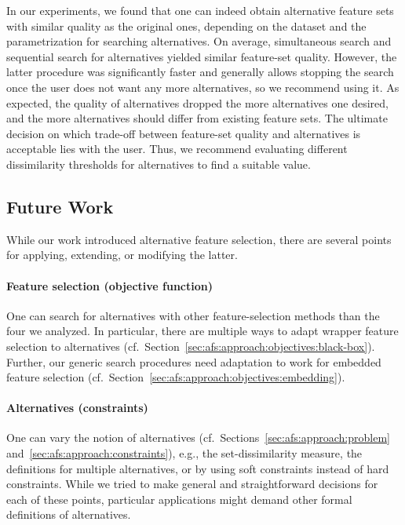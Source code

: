 \documentclass{article}
\theoremstyle{definition}
\begin{document}
In our experiments, we found that one can indeed obtain alternative feature sets with similar quality as the original ones, depending on the dataset and the parametrization for searching alternatives.
On average, simultaneous search and sequential search for alternatives yielded similar feature-set quality.
However, the latter procedure was significantly faster and generally allows stopping the search once the user does not want any more alternatives, so we recommend using it.
As expected, the quality of alternatives dropped the more alternatives one desired, and the more alternatives should differ from existing feature sets.
The ultimate decision on which trade-off between feature-set quality and alternatives is acceptable lies with the user.
Thus, we recommend evaluating different dissimilarity thresholds for alternatives to find a suitable value.

\subsection{Future Work}

While our work introduced alternative feature selection, there are several points for applying, extending, or modifying the latter.

\paragraph{Feature selection (objective function)}

One can search for alternatives with other feature-selection methods than the four we analyzed.
In particular, there are multiple ways to adapt wrapper feature selection to alternatives (cf.~Section~\ref{sec:afs:approach:objectives:black-box}).
Further, our generic search procedures need adaptation to work for embedded feature selection (cf.~Section~\ref{sec:afs:approach:objectives:embedding}).

\paragraph{Alternatives (constraints)}

One can vary the notion of alternatives (cf.~Sections~\ref{sec:afs:approach:problem} and~\ref{sec:afs:approach:constraints}), e.g., the set-dissimilarity measure, the definitions for multiple alternatives, or by using soft constraints instead of hard constraints.
While we tried to make general and straightforward decisions for each of these points, particular applications might demand other formal definitions of alternatives.
\end{document}
